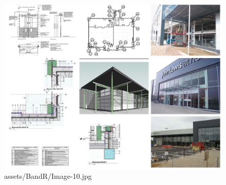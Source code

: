 \documentclass[
]{article}
\begin{document}
\begin{figure}[H]

{\centering \includegraphics{assets/BandR/Image-10.jpg}

}

\caption{assets/BandR/Image-10.jpg}

\end{figure}%
\end{document}
